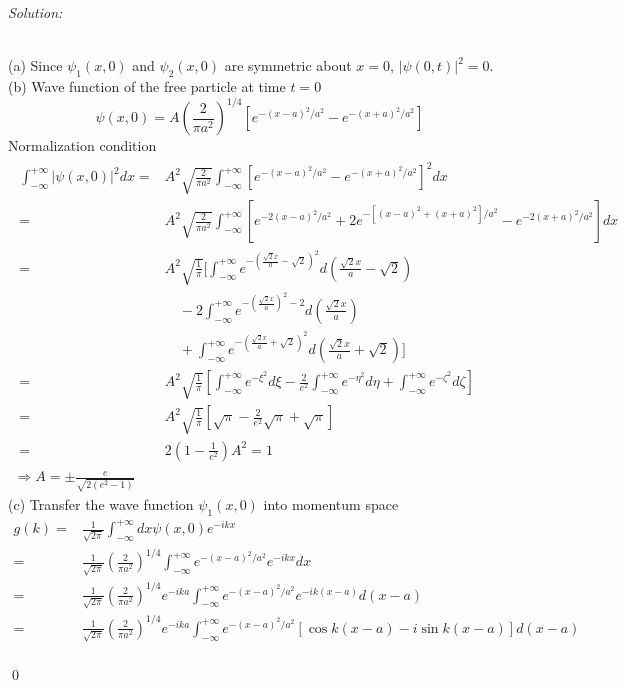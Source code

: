 \documentclass[12pt]{article}
\newenvironment{sol}
    {\emph{Solution:}
    }
    {
    \qed
    }
\begin{document}
\begin{sol}
\\(a) Since $\psi_1(x,0)$ and $\psi_2(x,0)$ are symmetric about $x=0$, $|\psi(0,t)|^2=0$.\\
(b) Wave function of the free particle at time $t=0$
\begin{equation}
\psi(x,0)=A(\frac{2}{\pi a^2})^{1/4}[e^{-(x-a)^2/a^2}-e^{-(x+a)^2/a^2}]
\end{equation}
Normalization condition
\begin{gather}
\begin{align}
\nonumber\int_{-\infty}^{+\infty}|\psi(x,0)|^2dx=&A^2\sqrt{\frac{2}{\pi a^2}}\int_{-\infty}^{+\infty}[e^{-(x-a)^2/a^2}-e^{-(x+a)^2/a^2}]^2dx\\
\nonumber=&A^2\sqrt{\frac{2}{\pi a^2}}\int_{-\infty}^{+\infty}[e^{-2(x-a)^2/a^2}+2e^{-[(x-a)^2+(x+a)^2]/a^2}-e^{-2(x+a)^2/a^2}]dx\\
\nonumber=&A^2\sqrt{\frac{1}{\pi}}[\int_{-\infty}^{+\infty}e^{-(\frac{\sqrt{2}x}{a}-\sqrt{2})^2}d(\frac{\sqrt{2}x}{a}-\sqrt{2})\\
\nonumber&\quad-2\int_{-\infty}^{+\infty}e^{-(\frac{\sqrt{2}x}{a})^2-2}d(\frac{\sqrt{2}x}{a})\\
\nonumber&\quad+\int_{-\infty}^{+\infty}e^{-(\frac{\sqrt{2}x}{a}+\sqrt{2})^2}d(\frac{\sqrt{2}x}{a}+\sqrt{2})]\\
\nonumber=&A^2\sqrt{\frac{1}{\pi}}[\int_{-\infty}^{+\infty}e^{-\xi^2}d\xi-\frac{2}{e^2}\int_{-\infty}^{+\infty}e^{-\eta^2}d\eta+\int_{-\infty}^{+\infty}e^{-\zeta^2}d\zeta]\\
\nonumber=&A^2\sqrt{\frac{1}{\pi}}[\sqrt{\pi}-\frac{2}{e^2}\sqrt{\pi}+\sqrt{\pi}]\\
=&2(1-\frac{1}{e^2})A^2=1
\end{align}\\
\Longrightarrow A=\pm\frac{e}{\sqrt{2(e^2-1)}}
\end{gather}
(c) Transfer the wave function $\psi_1(x,0)$ into momentum space
\begin{align}
\nonumber g(k)=&\frac{1}{\sqrt{2\pi}}\int_{-\infty}^{+\infty}dx\psi(x,0)e^{-ikx}\\
\nonumber=&\frac{1}{\sqrt{2\pi}}(\frac{2}{\pi a^2})^{1/4}\int_{-\infty}^{+\infty}e^{-(x-a)^2/a^2}e^{-ikx}dx\\
\nonumber=&\frac{1}{\sqrt{2\pi}}(\frac{2}{\pi a^2})^{1/4}e^{-ika}\int_{-\infty}^{+\infty}e^{-(x-a)^2/a^2}e^{-ik(x-a)}d(x-a)\\
\nonumber=&\frac{1}{\sqrt{2\pi}}(\frac{2}{\pi a^2})^{1/4}e^{-ika}\int_{-\infty}^{+\infty}e^{-(x-a)^2/a^2}[\cos k(x-a)-i\sin k(x-a)]d(x-a)\\

\end{align}
\end{sol}
\end{document}
